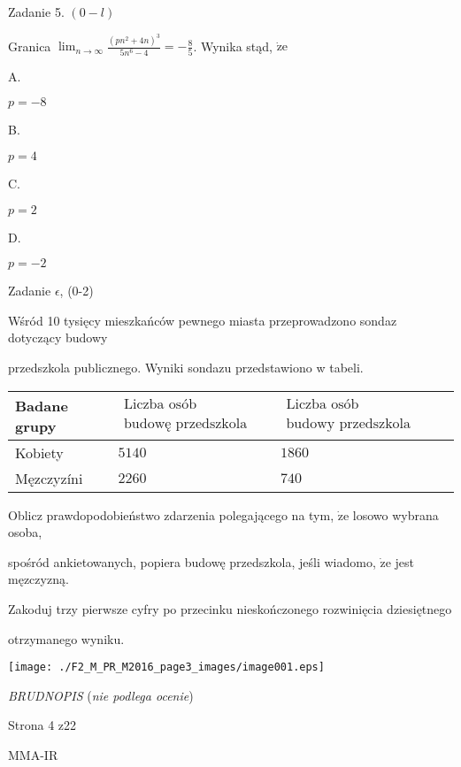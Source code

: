 \documentclass[a4paper,12pt]{article}
\begin{document}
Zadanie 5. $(0-l)$

Granica $\displaystyle \lim_{n\rightarrow\infty}\frac{(pn^{2}+4n)^{3}}{5n^{6}-4}=-\frac{8}{5}$. Wynika stąd, $\dot{\mathrm{z}}\mathrm{e}$

A.

$p=-8$

B.

$p=4$

C.

$p=2$

D.

$p=-2$

Zadanie $\epsilon$, (0-2)

Wśród 10 tysięcy mieszkańców pewnego miasta przeprowadzono sondaz dotyczący budowy

przedszkola publicznego. Wyniki sondaz$\mathrm{u}$ przedstawiono w tabeli.
\begin{center}
\begin{tabular}{|l|l|l|}
\hline
\multicolumn{1}{|l|}{Badane grupy}&	\multicolumn{1}{|l|}{$\begin{array}{l}\mbox{Liczba osób popierających}	\\	\mbox{budowę przedszkola}	\end{array}$}&	\multicolumn{1}{|l|}{$\begin{array}{l}\mbox{Liczba osób niepopierających}	\\	\mbox{budowy przedszkola}	\end{array}$}	\\
\hline
\multicolumn{1}{|l|}{Kobiety}&	\multicolumn{1}{|l|}{$5140$}&	\multicolumn{1}{|l|}{ $1860$}	\\
\hline
\multicolumn{1}{|l|}{Męzczyzíni}&	\multicolumn{1}{|l|}{$2260$}&	\multicolumn{1}{|l|}{ $740$}	\\
\hline
\end{tabular}

\end{center}
Oblicz prawdopodobieństwo zdarzenia polegającego na tym, $\dot{\mathrm{z}}\mathrm{e}$ losowo wybrana osoba,

spośród ankietowanych, popiera budowę przedszkola, jeśli wiadomo, $\dot{\mathrm{z}}\mathrm{e}$ jest męzczyzną.

Zakoduj trzy pierwsze cyfry po przecinku nieskończonego rozwinięcia dziesiętnego

otrzymanego wyniku.
\begin{center}
\texttt{[image: ./F2\_M\_PR\_M2016\_page3\_images/image001.eps]}
\end{center}
{\it BRUDNOPIS} ({\it nie podlega ocenie})

Strona 4 z22

MMA-IR
\end{document}

